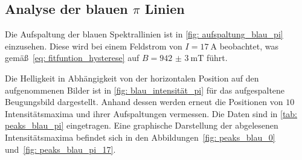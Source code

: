 \subsection{Analyse der blauen $\pi$ Linien}
Die Aufspaltung der blauen Spektrallinien ist in \autoref{fig: aufspaltung_blau_pi} einzusehen. Diese wird bei einem
Feldstrom von $I = \SI{17}{\ampere}$ beobachtet, was gemäß~\eqref{eq: fitfuntion_hysterese} auf $B = \SI{942(3)}{\milli\tesla}$ führt.

Die Helligkeit in Abhängigkeit von der horizontalen Position auf den aufgenommenen Bilder ist in \autoref{fig: blau_intensität_pi} für das aufgespaltene Beugungsbild dargestellt.
Anhand dessen werden erneut die Positionen von $10$ Intensitätsmaxima und ihrer Aufspaltungen
vermessen. Die Daten sind in \autoref{tab: peaks_blau_pi} eingetragen. Eine graphische Darstellung
der abgelesenen Intensitätsmaxima befindet sich in den Abbildungen~\ref{fig: peaks_blau_0} und~\ref{fig: peaks_blau_pi_17}.


